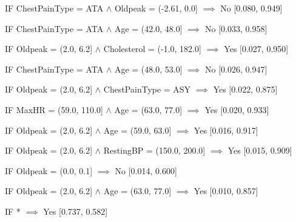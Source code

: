IF ChestPainType = ATA $\land$ Oldpeak = (-2.61, 0.0] $\implies$ No [0.080, 0.949]

IF ChestPainType = ATA $\land$ Age = (42.0, 48.0] $\implies$ No [0.033, 0.958]

IF Oldpeak = (2.0, 6.2] $\land$ Cholesterol = (-1.0, 182.0] $\implies$ Yes [0.027, 0.950]

IF ChestPainType = ATA $\land$ Age = (48.0, 53.0] $\implies$ No [0.026, 0.947]

IF Oldpeak = (2.0, 6.2] $\land$ ChestPainType = ASY $\implies$ Yes [0.022, 0.875]

IF MaxHR = (59.0, 110.0] $\land$ Age = (63.0, 77.0] $\implies$ Yes [0.020, 0.933]

IF Oldpeak = (2.0, 6.2] $\land$ Age = (59.0, 63.0] $\implies$ Yes [0.016, 0.917]

IF Oldpeak = (2.0, 6.2] $\land$ RestingBP = (150.0, 200.0] $\implies$ Yes [0.015, 0.909]

IF Oldpeak = (0.0, 0.1] $\implies$ No [0.014, 0.600]

IF Oldpeak = (2.0, 6.2] $\land$ Age = (63.0, 77.0] $\implies$ Yes [0.010, 0.857]

IF * $\implies$ Yes [0.737, 0.582]
